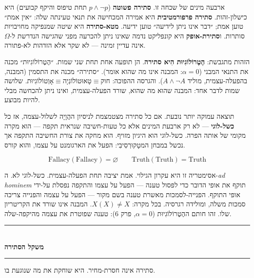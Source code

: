 \documentclass[10pt, openany, oneside]{book}
\renewcommand{\normalsize}{\fontsize{10}{13}\selectfont}
\begin{document}
ארבעה מינים של שכחה זו. \textbf{סתירה פשוטה} ($p \wedge \neg p$ תחת טיפוס והיקף קבועים) היא כישלון-זהות. \textbf{סתירה פרפורמטיבית} היא אמירה המכחישה את תנאי טעינתה שלה: ״אין אמת״ טוען אמת; ״דבר אינו ניתן לידיעה״ טוען ידיעה. \textbf{מטא-סתירה} היא שיטה שמנפיקה מחויבויות סותרות. ו\textbf{סתירת-אופק} היא קונפליקט נדמה שאינו ניתן להכרעה מפני שהגישה הנדרשת ל-$\Omega$ אינה עדיין זמינה — לא שקר אלא הזדהות לא-פתורה.

הזהות מתגבשת: \textbf{הֶטֶרוֹלוֹגִיוּת הִיא סתירה}. הן תופעה אחת תחת שני שמות. ״הֶטֶרוֹלוֹגִיוּת״ מכנה את התנאי המבני ($\alpha = 0$: המבנה אינו מה שהוא אומר). ״סתירה״ מכנה את התסמין (המבנה, בהפעלה-עצמית, מוליד $A \wedge \neg A$). והגרסה ההפוכה: $\text{אָוְטוֹלוֹגִיוּת} \equiv \text{טָאוּטוֹלוֹגְיָה} \equiv \text{חוק}$. שלושה שמות לדבר אחד: המבנה שהוּא מה שהוא, שורד הפעלה-עצמית, ואינו ניתן להכחשה מבלי להיות מבוצע.

תוצאה עמוקה יותר נובעת. אם כל סתירה מצטמצמת לניסיון ההֲוָיָה לשלול-עצמה, אז כל \textbf{כשל-לוגי} — לא רק ארבעת המינים אלא כל טעות-חשיבה שנראית תקפה — הוא מקרה מקומי של אותה הפרה. כשל-לוגי הוא היגיון מזויף. הוא מחקה את צורת החשיבה התקפה אך נכשל במבחן המטָקוּרְסִיבִי: הפעל את הארגומנט על עצמו, והוא קורס.

$$\text{Fallacy}(\text{Fallacy}) = \varnothing \qquad \text{Truth}(\text{Truth}) = \text{Truth}$$

אסימטריה זו היא עקרון הגילוי. אמת יציבה תחת הפעלה-עצמית. כשל-לוגי לא. ה-\textit{ad hominem} תוקף את אופי הדובר כדי לפסול טענה — הפעל על עצמו והתקפה נפסלת על-ידי אופי התוקף. הפנייה-לסמכות מאשרת טענה בשם מקור — הפעל על עצמה והפנייה צריכה סמכות משלה, ומולידה רגרסיה. בכל מקרה: $X(X) \neq X$. המבנה אינו שורד את הקריטריון שלו. זהו חותם ההֶטֶרוֹלוֹגִיוּת ($\alpha = 0$, פרק 6): טענה שפוטרת את עצמה מהיקפה-שלה.

\vspace{1.5em}


\begin{center}
    \rule{0.3\textwidth}{0.4pt}\\[0.5em]
    {\normalsize\bfseries\textsc{משקל הסתירה}}\\[0.3em]
    \rule{0.3\textwidth}{0.4pt}
\end{center}

\vspace{1em}

\noindent סתירה אינה חסרת-מחיר. היא שוחקת את מה שנוגעת בו.
\end{document}
